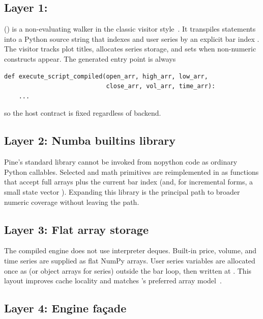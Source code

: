 \documentclass[11pt,a4paper]{article}
\begin{document}
\subsection{Layer 1: }

 () is a non-evaluating \ast{} walker
in the classic visitor style~\citep{gamma1994design,aho2006dragon}. It
transpiles statements into a Python source string that indexes \ohlcv{} and
user series by an explicit bar index . The visitor tracks
plot titles, allocates series storage, and sets  when
non-numeric constructs appear. The generated entry point is always
\begin{lstlisting}[style=python,numbers=none]
def execute_script_compiled(open_arr, high_arr, low_arr,
                            close_arr, vol_arr, time_arr):
    ...
\end{lstlisting}
so the host contract is fixed regardless of backend.

\subsection{Layer 2: Numba builtins library}

Pine's standard library cannot be invoked from nopython code as ordinary
Python callables. Selected \ta{} and math primitives are reimplemented in
 as  functions that
accept full arrays plus the current bar index (and, for incremental forms,
a small state vector ). Expanding this library is the principal path
to broader numeric coverage without leaving the \jit{} path.

\subsection{Layer 3: Flat array storage}

The compiled engine does not use interpreter  deques.
Built-in price, volume, and time series are supplied as flat NumPy arrays.
User series variables are allocated once as
 (or object arrays for \udt{} series) outside
the bar loop, then written at . This layout improves
cache locality and matches \numba{}'s preferred array
model~\citep{harris2020numpy}.

\subsection{Layer 4: Engine fa\c{c}ade}
\end{document}
